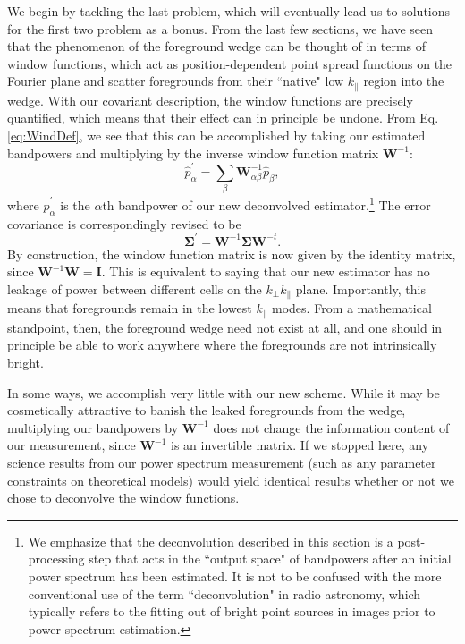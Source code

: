 \documentclass[twocolumn,aps,prd,nofootinbib,showpacs]{revtex4-1}
\begin{document}
We begin by tackling the last problem, which will eventually lead us to solutions for the first two problem as a bonus.  From the last few sections, we have seen that the phenomenon of the foreground wedge can be thought of in terms of window functions, which act as position-dependent point spread functions on the Fourier plane and scatter foregrounds from their ``native" low $k_\parallel$ region into the wedge.  With our covariant description, the window functions are precisely quantified, which means that their effect can in principle be undone.  From Eq. \eqref{eq:WindDef}, we see that this can be accomplished by taking our estimated bandpowers and multiplying by the inverse window function matrix $\mathbf{W}^{-1}$:
\begin{equation}
\hat{p}_\alpha^\prime = \sum_{\beta} \mathbf{W}^{-1}_{\alpha \beta} \widehat{p}_\beta,
\end{equation}
where $\hat{p}_\alpha^\prime$ is the $\alpha$th bandpower of our new deconvolved estimator.\footnote{We emphasize that the deconvolution described in this section is a post-processing step that acts in the ``output space" of bandpowers after an initial power spectrum has been estimated.  It is not to be confused with the more conventional use of the term ``deconvolution" in radio astronomy, which typically refers to the fitting out of bright point sources in images prior to power spectrum estimation.}  The error covariance is correspondingly revised to be
\begin{equation}
\boldsymbol \Sigma^\prime =  \mathbf{W}^{-1} \boldsymbol \Sigma \mathbf{W}^{-t}.
\end{equation}
By construction, the window function matrix is now given by the identity matrix, since $\mathbf{W}^{-1} \mathbf{W} = \mathbf{I}$.  This is equivalent to saying that our new estimator has no leakage of power between different cells on the $k_\perp k_\parallel$ plane.  Importantly, this means that foregrounds remain in the lowest $k_\parallel$ modes.  From a mathematical standpoint, then, the foreground wedge need not exist at all, and one should in principle be able to work anywhere where the foregrounds are not intrinsically bright.

In some ways, we accomplish very little with our new scheme.  While it may be cosmetically attractive to banish the leaked foregrounds from the wedge, multiplying our bandpowers by $\mathbf{W}^{-1}$ does not change the information content of our measurement, since $\mathbf{W}^{-1}$ is an invertible matrix.  If we stopped here, any science results from our power spectrum measurement (such as any parameter constraints on theoretical models) would yield identical results whether or not we chose to deconvolve the window functions.
\end{document}

